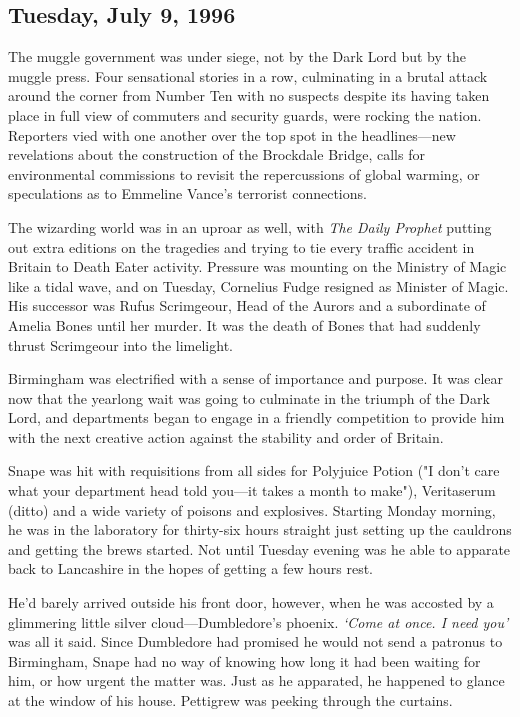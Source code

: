 \subsection{Tuesday, July 9, 1996}

The muggle government was under siege, not by the Dark Lord but by the muggle press. Four sensational stories in a row, culminating in a brutal attack around the corner from Number Ten with no suspects despite its having taken place in full view of commuters and security guards, were rocking the nation. Reporters vied with one another over the top spot in the headlines—new revelations about the construction of the Brockdale Bridge, calls for environmental commissions to revisit the repercussions of global warming, or speculations as to Emmeline Vance's terrorist connections.

The wizarding world was in an uproar as well, with \emph{The Daily Prophet} putting out extra editions on the tragedies and trying to tie every traffic accident in Britain to Death Eater activity. Pressure was mounting on the Ministry of Magic like a tidal wave, and on Tuesday, Cornelius Fudge resigned as Minister of Magic. His successor was Rufus Scrimgeour, Head of the Aurors and a subordinate of Amelia Bones until her murder. It was the death of Bones that had suddenly thrust Scrimgeour into the limelight.

Birmingham was electrified with a sense of importance and purpose. It was clear now that the yearlong wait was going to culminate in the triumph of the Dark Lord, and departments began to engage in a friendly competition to provide him with the next creative action against the stability and order of Britain.

Snape was hit with requisitions from all sides for Polyjuice Potion ("I don't care what your department head told you—it takes a month to make"), Veritaserum (ditto) and a wide variety of poisons and explosives. Starting Monday morning, he was in the laboratory for thirty-six hours straight just setting up the cauldrons and getting the brews started. Not until Tuesday evening was he able to apparate back to Lancashire in the hopes of getting a few hours rest.

He'd barely arrived outside his front door, however, when he was accosted by a glimmering little silver cloud—Dumbledore's phoenix. \emph{`Come at once. I need you'} was all it said. Since Dumbledore had promised he would not send a patronus to Birmingham, Snape had no way of knowing how long it had been waiting for him, or how urgent the matter was. Just as he apparated, he happened to glance at the window of his house. Pettigrew was peeking through the curtains.

